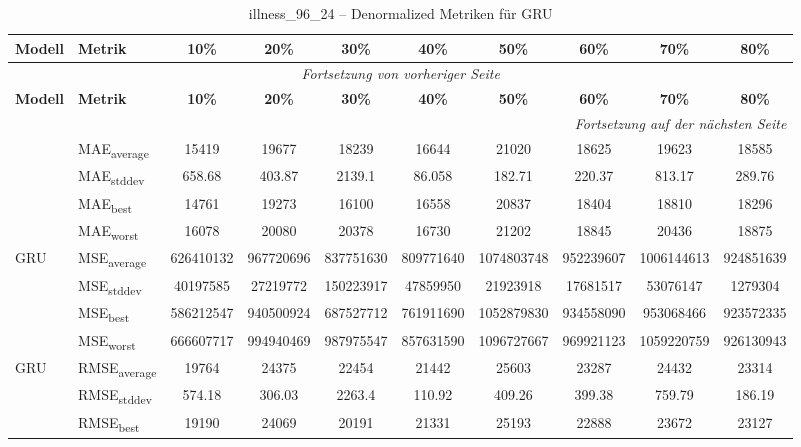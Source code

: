 {\small
\begin{longtable}{l l c c c c c c c c}
    \toprule
    \textbf{Modell} & \textbf{Metrik} & \textbf{10\%} & \textbf{20\%} & \textbf{30\%} & \textbf{40\%} & \textbf{50\%} & \textbf{60\%} & \textbf{70\%} & \textbf{80\%} \\
    \midrule
    \endfirsthead
    \multicolumn{10}{c}{\textit{Fortsetzung von vorheriger Seite}} \\
    \toprule
    \textbf{Modell} & \textbf{Metrik} & \textbf{10\%} & \textbf{20\%} & \textbf{30\%} & \textbf{40\%} & \textbf{50\%} & \textbf{60\%} & \textbf{70\%} & \textbf{80\%} \\
    \midrule
    \endhead
    \midrule
    \multicolumn{10}{r}{\textit{Fortsetzung auf der nächsten Seite}} \\
    \midrule
    \endfoot
    \bottomrule
    \caption{illness_96_24 -- Denormalized Metriken für GRU}
    \label{tab:illness_96_24_denormalized_gru}
    \endlastfoot
\multirow{4}{*}{GRU} & MAE\textsubscript{average} & 15419 & 19677 & 18239 & 16644 & 21020 & 18625 & 19623 & 18585 \\
 & MAE\textsubscript{stddev} & 658.68 & 403.87 & 2139.1 & 86.058 & 182.71 & 220.37 & 813.17 & 289.76 \\
 & MAE\textsubscript{best} & 14761 & 19273 & 16100 & 16558 & 20837 & 18404 & 18810 & 18296 \\
 & MAE\textsubscript{worst} & 16078 & 20080 & 20378 & 16730 & 21202 & 18845 & 20436 & 18875 \\
\cmidrule(lr){2-10}
\multirow{4}{*}{GRU} & MSE\textsubscript{average} & 626410132 & 967720696 & 837751630 & 809771640 & 1074803748 & 952239607 & 1006144613 & 924851639 \\
 & MSE\textsubscript{stddev} & 40197585 & 27219772 & 150223917 & 47859950 & 21923918 & 17681517 & 53076147 & 1279304 \\
 & MSE\textsubscript{best} & 586212547 & 940500924 & 687527712 & 761911690 & 1052879830 & 934558090 & 953068466 & 923572335 \\
 & MSE\textsubscript{worst} & 666607717 & 994940469 & 987975547 & 857631590 & 1096727667 & 969921123 & 1059220759 & 926130943 \\
\cmidrule(lr){2-10}
\multirow{4}{*}{GRU} & RMSE\textsubscript{average} & 19764 & 24375 & 22454 & 21442 & 25603 & 23287 & 24432 & 23314 \\
 & RMSE\textsubscript{stddev} & 574.18 & 306.03 & 2263.4 & 110.92 & 409.26 & 399.38 & 759.79 & 186.19 \\
 & RMSE\textsubscript{best} & 19190 & 24069 & 20191 & 21331 & 25193 & 22888 & 23672 & 23127 \\

\end{longtable}}
